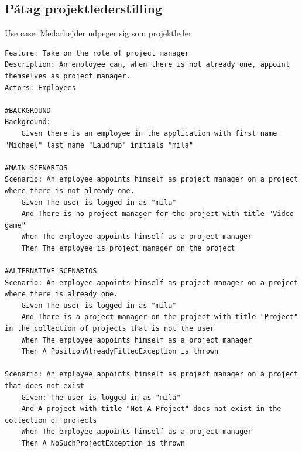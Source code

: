 \subsection{Påtag projektlederstilling} 
\begin{listing}[H]
    \centering
    \caption{Use case: Medarbejder udpeger sig som projektleder} \label{lst:usecase_bliv_projektleder}
    \begin{verbatim}  
Feature: Take on the role of project manager
Description: An employee can, when there is not already one, appoint themselves as project manager.
Actors: Employees

#BACKGROUND
Background:
    Given there is an employee in the application with first name "Michael" last name "Laudrup" initials "mila"

#MAIN SCENARIOS
Scenario: An employee appoints himself as project manager on a project where there is not already one.
    Given The user is logged in as "mila"
    And There is no project manager for the project with title "Video game"
    When The employee appoints himself as a project manager
    Then The employee is project manager on the project

#ALTERNATIVE SCENARIOS
Scenario: An employee appoints himself as project manager on a project where there is already one.
    Given The user is logged in as "mila"
    And There is a project manager on the project with title "Project" in the collection of projects that is not the user
    When The employee appoints himself as a project manager
    Then A PositionAlreadyFilledException is thrown

Scenario: An employee appoints himself as project manager on a project that does not exist
    Given: The user is logged in as "mila"
    And A project with title "Not A Project" does not exist in the collection of projects
    When The employee appoints himself as a project manager
    Then A NoSuchProjectException is thrown
    \end{verbatim}
\end{listing}


